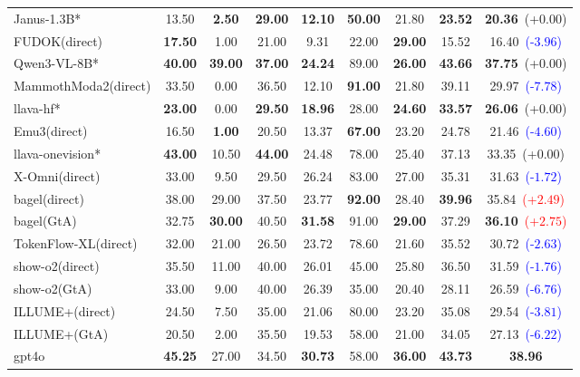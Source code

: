 \documentclass{article}
\theoremstyle{plain}
\theoremstyle{definition}
\theoremstyle{remark}
\begin{document}
\begin{table}[t]
{\begin{tabular}{@{}lcccccccc@{}}
\midrule
\rowcolor{gray!12}
Janus-1.3B* & 13.50 & \textbf{2.50} & \textbf{29.00} & \textbf{12.10} & \textbf{50.00} & 21.80 & \textbf{23.52} & \textbf{20.36}~(+$0.00$) \\
FUDOK(direct) & \textbf{17.50} & 1.00 & 21.00 & 9.31 & 22.00 & \textbf{29.00} & 15.52 & 16.40~\textcolor{blue}{(-$3.96$)} \\
\midrule
\rowcolor{gray!12}
Qwen3-VL-8B* & \textbf{40.00} & \textbf{39.00} & \textbf{37.00} & \textbf{24.24} & 89.00 & \textbf{26.00} & \textbf{43.66} & \textbf{37.75}~(+$0.00$) \\
MammothModa2(direct) & 33.50 & 0.00 & 36.50 & 12.10 & \textbf{91.00} & 21.80 & 39.11 & 29.97~\textcolor{blue}{(-$7.78$)} \\
\midrule
\rowcolor{gray!12}
llava-hf* & \textbf{23.00} & 0.00 & \textbf{29.50} & \textbf{18.96} & 28.00 & \textbf{24.60} & \textbf{33.57} & \textbf{26.06}~(+$0.00$) \\
Emu3(direct) & 16.50 & \textbf{1.00} & 20.50 & 13.37 & \textbf{67.00} & 23.20 & 24.78 & 21.46~\textcolor{blue}{(-$4.60$)} \\
\midrule
\rowcolor{gray!12}
llava-onevision* & \textbf{43.00} & 10.50 & \textbf{44.00} & 24.48 & 78.00 & 25.40 & 37.13 & 33.35~(+$0.00$) \\
X-Omni(direct) & 33.00 & 9.50 & 29.50 & 26.24 & 83.00 & 27.00 & 35.31 & 31.63~\textcolor{blue}{(-$1.72$)} \\
bagel(direct) & 38.00 & 29.00 & 37.50 & 23.77 & \textbf{92.00} & 28.40 & \textbf{39.96} & 35.84~\textcolor{red}{(+$2.49$)} \\
bagel(GtA) & 32.75 & \textbf{30.00} & 40.50 & \textbf{31.58} & 91.00 & \textbf{29.00} & 37.29 & \textbf{36.10}~\textcolor{red}{(+$2.75$)} \\
TokenFlow-XL(direct) & 32.00 & 21.00 & 26.50 & 23.72 & 78.60 & 21.60 & 35.52 & 30.72~\textcolor{blue}{(-$2.63$)} \\
show-o2(direct) & 35.50 & 11.00 & 40.00 & 26.01 & 45.00 & 25.80 & 36.50 & 31.59~\textcolor{blue}{(-$1.76$)} \\
show-o2(GtA) & 33.00 & 9.00 & 40.00 & 26.39 & 35.00 & 20.40 & 28.11 & 26.59~\textcolor{blue}{(-$6.76$)} \\
ILLUME+(direct) & 24.50 & 7.50 & 35.00 & 21.06 & 80.00 & 23.20 & 35.08 & 29.54~\textcolor{blue}{(-$3.81$)} \\
ILLUME+(GtA) & 20.50 & 2.00 & 35.50 & 19.53 & 58.00 & 21.00 & 34.05 & 27.13~\textcolor{blue}{(-$6.22$)} \\
\midrule
\rowcolor{orange!8}
gpt4o & \textbf{45.25} & 27.00 & 34.50 & \textbf{30.73} & 58.00 & \textbf{36.00} & \textbf{43.73} & \textbf{38.96} \\

\end{tabular}}
\end{table}
\end{document}
